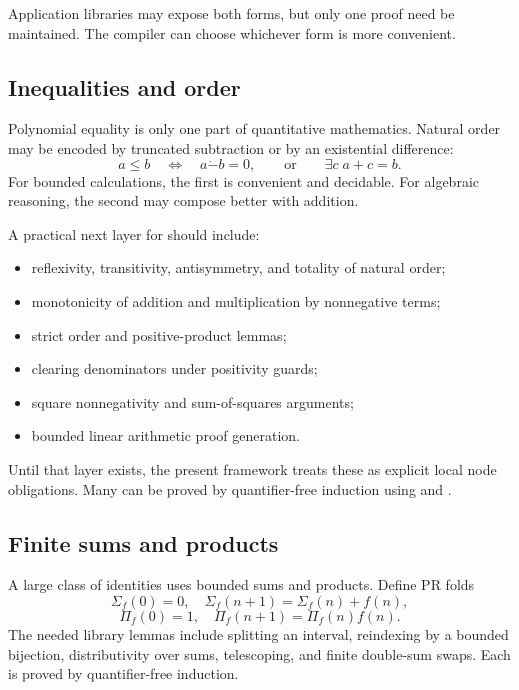 Application libraries may expose both forms, but only one proof need be
maintained.  The compiler can choose whichever form is more convenient.

\subsection{Inequalities and order}

Polynomial equality is only one part of quantitative mathematics.  Natural
order may be encoded by truncated subtraction or by an existential difference:
\[
   a\le b\quad\Longleftrightarrow\quad a\mathbin{\dot-}b=0,
   \qquad\text{or}\qquad \exists c\;a+c=b.
\]
For bounded calculations, the first is convenient and decidable.  For algebraic
reasoning, the second may compose better with addition.

A practical next layer for  should include:

\begin{itemize}
\item reflexivity, transitivity, antisymmetry, and totality of natural order;
\item monotonicity of addition and multiplication by nonnegative terms;
\item strict order and positive-product lemmas;
\item clearing denominators under positivity guards;
\item square nonnegativity and sum-of-squares arguments;
\item bounded linear arithmetic proof generation.
\end{itemize}

Until that layer exists, the present framework treats these as explicit local
node obligations.  Many can be proved by quantifier-free induction using
 and .

\subsection{Finite sums and products}

A large class of identities uses bounded sums and products.  Define PR folds
\[
 \Sigma_f(0)=0,\quad \Sigma_f(n+1)=\Sigma_f(n)+f(n),
\]
\[
 \Pi_f(0)=1,\quad \Pi_f(n+1)=\Pi_f(n)f(n).
\]
The needed library lemmas include splitting an interval, reindexing by a bounded
bijection, distributivity over sums, telescoping, and finite double-sum swaps.
Each is proved by quantifier-free induction.

